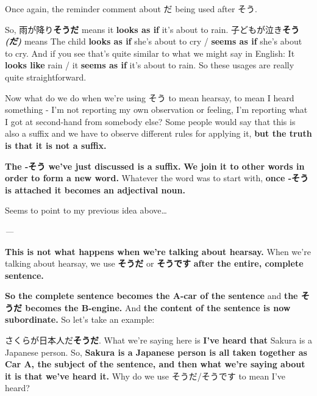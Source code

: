 {}

Once again, the reminder comment about だ being used after そう.

So, 雨が降り{\bf そうだ} means it {\bf looks as if} it's about to rain. 子どもが泣き{\bf そう{\em (だ)}} means The child {\bf looks as if} she's about to cry / {\bf seems as if} she's about to cry. And if you see that's quite similar to what we might say in English: It {\bf looks like} rain / it {\bf seems as if} it's about to rain. So these usages are really quite straightforward.

\stopsectionlevel

\stopsectionlevel

\startsectionlevel[title={そう as hearsay},reference={そう-as-hearsay}]

Now what do we do when we're using そう to mean hearsay, to mean I heard something - I'm not reporting my own observation or feeling, I'm reporting what I got at second-hand from somebody else? Some people would say that this is also a suffix and we have to observe different rules for applying it, {\bf but the truth is that it is not a suffix.}

\thinrule

{\bf The -そう we've just discussed is a suffix.} {\bf We join it to other words in order to form a new word.} Whatever the word was to start with, {\bf once -そう is attached it becomes an adjectival noun.}

Seems to point to my previous idea above\ldots{}

{\em ---}

{\bf This is not what happens when we're talking about hearsay.} When we're talking about hearsay, we use {\bf そうだ} or {\bf そうです} {\bf after the entire, complete sentence.}

{}

{\bf So the complete sentence becomes the A-car of the sentence} and {\bf the そうだ becomes the B-engine.} And {\bf the content of the sentence is now subordinate.} So let's take an example:

{}

さくらが日本人だ{\bf そうだ}. What we're saying here is {\bf I've heard that} Sakura is a Japanese person. So, {\bf Sakura is a Japanese person is all taken together as Car A, the subject of the sentence, and then what we're saying about it is that we've heard it.} Why do we use そうだ/そうです to mean I've heard?

